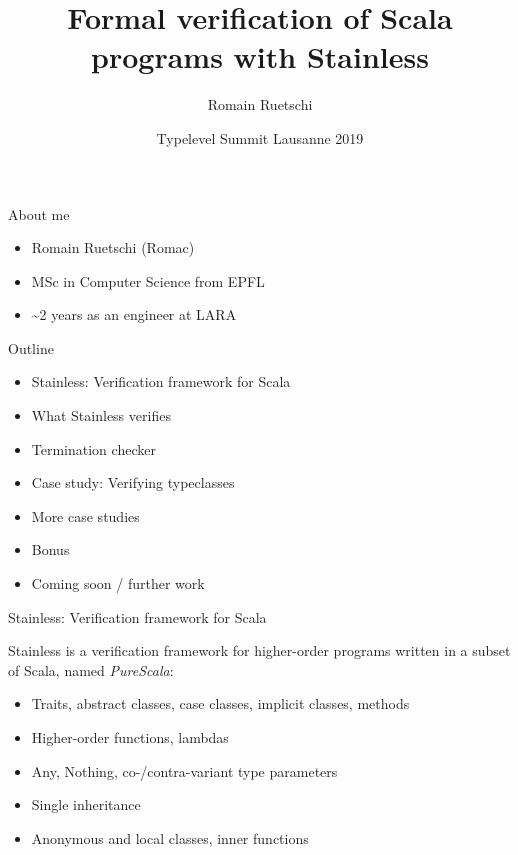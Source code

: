 \documentclass[
  ignorenonframetext,
]{beamer}
\institute{Laboratory for Automated Reasoning and Analysis, EPFL}
\title{Formal verification of Scala programs with Stainless}
\author{Romain Ruetschi}
\date{Typelevel Summit Lausanne 2019}
\providecommand{\tightlist}{%
  \setlength{\itemsep}{0pt}\setlength{\parskip}{0pt}}
\begin{document}
\frame{\titlepage}

\begin{frame}{About me}
\protect\hypertarget{about-me}{}

\begin{itemize}
\tightlist
\item
  Romain Ruetschi (Romac)
\item
  MSc in Computer Science from EPFL
\item
  \textasciitilde2 years as an engineer at LARA
\end{itemize}

\end{frame}

\begin{frame}{Outline}
\protect\hypertarget{outline}{}

\begin{itemize}
\tightlist
\item
  Stainless: Verification framework for Scala
\item
  What Stainless verifies
\item
  Termination checker
\item
  Case study: Verifying typeclasses
\item
  More case studies
\item
  Bonus
\item
  Coming soon / further work
\end{itemize}

\end{frame}

\begin{frame}{Stainless: Verification framework for Scala}
\protect\hypertarget{stainless-verification-framework-for-scala}{}

Stainless is a verification framework for higher-order programs written
in a subset of Scala, named \emph{PureScala}:

\begin{itemize}
\tightlist
\item
  Traits, abstract classes, case classes, implicit classes, methods
\item
  Higher-order functions, lambdas
\item
  Any, Nothing, co-/contra-variant type parameters
\item
  Single inheritance
\item
  Anonymous and local classes, inner functions
\end{itemize}

\end{frame}
\end{document}
